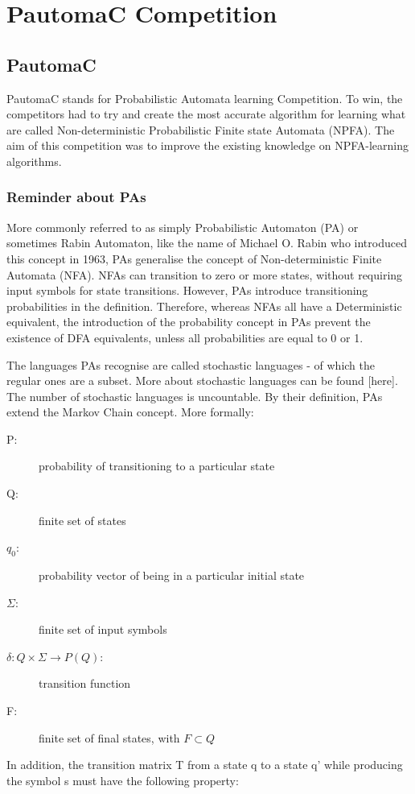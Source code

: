 \section{PautomaC Competition}

\subsection{PautomaC}

PautomaC stands for Probabilistic Automata learning Competition. To
win, the competitors had to try and create the most accurate algorithm
for learning what are called Non-deterministic Probabilistic Finite
state Automata (NPFA). The aim of this competition was to improve
the existing knowledge on NPFA-learning algorithms.


\subsubsection{Reminder about PAs}

More commonly referred to as simply Probabilistic Automaton (PA) or
sometimes Rabin Automaton, like the name of Michael O. Rabin who introduced
this concept in 1963, PAs generalise the concept of Non-deterministic
Finite Automata (NFA). NFAs can transition to zero or more states,
without requiring input symbols for state transitions. However, PAs
introduce transitioning probabilities in the definition. Therefore,
whereas NFAs all have a Deterministic equivalent, the introduction
of the probability concept in PAs prevent the existence of DFA equivalents,
unless all probabilities are equal to 0 or 1.

The languages PAs recognise are called stochastic languages - of which
the regular ones are a subset. More about stochastic languages can
be found {[}here{]}. The number of stochastic languages is uncountable.
By their definition, PAs extend the Markov Chain concept. More formally:
\begin{description}
\item [{P:}] probability of transitioning to a particular state
\item [{Q:}] finite set of states
\item [{$q_{0}$:}] probability vector of being in a particular initial
state
\item [{$\varSigma$:}] finite set of input symbols
\item [{$\delta:Q\times\varSigma\longrightarrow P(Q)$:}] transition function
\item [{F:}] finite set of final states, with $F\subset Q$
\end{description}
In addition, the transition matrix T from a state q to a state q'
while producing the symbol s must have the following property:

